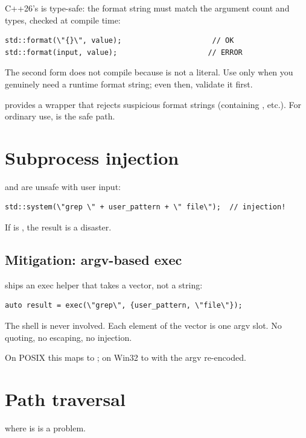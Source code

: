 C++26's  is type-safe: the format string must
match the argument count and types, checked at compile time:

\begin{lstlisting}
std::format(\"{}\", value);                     // OK
std::format(input, value);                     // ERROR
\end{lstlisting}

The second form does not compile because  is not a
literal. Use  only when you genuinely need
a runtime format string; even then, validate it first.

\maya{} provides a wrapper that rejects suspicious format
strings (containing , etc.). For ordinary use,
 is the safe path.

\section{Subprocess injection}

 and  are unsafe with user input:

\begin{lstlisting}
std::system(\"grep \" + user_pattern + \" file\");  // injection!
\end{lstlisting}

If  is , the result is a
disaster.

\subsection*{Mitigation: argv-based exec}

\maya{} ships an exec helper that takes a vector, not a string:

\begin{lstlisting}
auto result = exec(\"grep\", {user_pattern, \"file\"});
\end{lstlisting}

The shell is never involved. Each element of the vector is one
argv slot. No quoting, no escaping, no injection.

On POSIX this maps to ; on Win32 to
 with the argv re-encoded.

\section{Path traversal}

 where 
is  is a problem.

